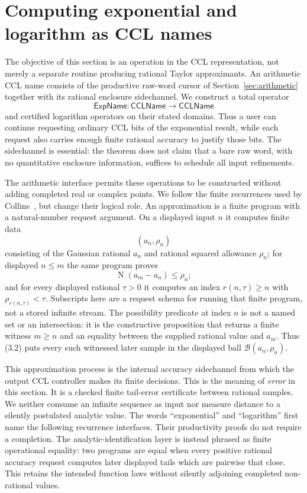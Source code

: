 \documentclass[10pt]{article}
\theoremstyle{definition}
\theoremstyle{remark}
\newcommand{\Norm}{\operatorname{N}}
\begin{document}
\section{Computing exponential and logarithm as CCL names}

The objective of this section is an operation in the CCL representation,
not merely a separate routine producing rational Taylor approximants.  An
arithmetic CCL name consists of the productive raw-word cursor of
Section~\ref{sec:arithmetic}
together with its rational enclosure sidechannel.  We construct a total
operator
\[
 \mathsf{ExpName}:\mathsf{CCLName}\longrightarrow\mathsf{CCLName}
\]
and certified logarithm operators on their stated domains.  Thus a user can
continue requesting ordinary CCL bits of the exponential result, while each
request also carries enough finite rational accuracy to justify those bits.
The sidechannel is essential: the theorem does not claim that a bare raw word,
with no quantitative enclosure information, suffices to schedule all input
refinements.

The arithmetic interface permits these operations to be constructed without
adding completed real or complex points.  We follow the finite recurrences
used by Collins~\cite{collins}, but change their logical role.
An approximation is a finite program with a natural-number request argument.
On a displayed input $n$ it computes finite data
\[
 (a_n,\rho_n)
 \tag{3.1}
\]
consisting of the Gaussian rational $a_n$ and rational squared allowance
$\rho_n$; for displayed $n\le m$ the same program proves
\[
 \Norm(a_m-a_n)\le\rho_n;
 \tag{3.2}
\]
and for every displayed rational $\tau>0$ it computes an index
$r(n,\tau)\ge n$ with $\rho_{r(n,\tau)}<\tau$.  Subscripts here are a request
schema for running that finite program, not a stored infinite stream.  The
possibility predicate at index $n$ is not a named set or an intersection: it
is the constructive proposition that returns a finite witness $m\ge n$ and
an equality between the supplied rational value and $a_m$.  Thus (3.2) puts
every such witnessed later sample in the displayed ball
$\mathcal B(a_n,\rho_n)$.

This approximation process is the internal accuracy sidechannel from which
the output CCL controller makes its finite decisions.  This is the meaning of
\emph{error} in this section.  It is a checked finite
tail-error certificate between rational samples.  We neither consume an
infinite sequence as input nor measure distance to a silently postulated
analytic value.  The words ``exponential'' and ``logarithm'' first name the
following recurrence interfaces.  Their productivity proofs do not require a
completion.  The analytic-identification layer is instead phrased as finite
operational equality: two programs are equal when every positive rational
accuracy request computes later displayed tails which are pairwise that
close.  This retains the intended function laws without silently adjoining
completed non-rational values.
\end{document}
